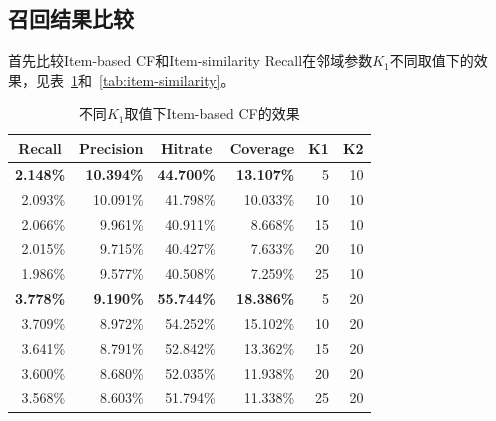     \subsection{召回结果比较}
    首先比较Item-based CF和Item-similarity Recall在邻域参数$K_1$不同取值下的效果，见表~\ref{tab:item-cf}和~\ref{tab:item-similarity}。
    \begin{table}[htbp]
      \centering
      \caption{不同$K_1$取值下Item-based CF的效果}
      \begin{tabular}{rrrrrr}
        \toprule
        \multicolumn{1}{c}{Recall} & \multicolumn{1}{c}{Precision} & \multicolumn{1}{c}{Hit\;rate} & \multicolumn{1}{c}{Coverage} & \multicolumn{1}{c}{K1} & \multicolumn{1}{c}{K2} \\
        \midrule
        \textbf{2.148\%} & \textbf{10.394\%} & \textbf{44.700\%} & \textbf{13.107\%} & 5    & 10 \\
        2.093\% & 10.091\% & 41.798\% & 10.033\% & 10   & 10 \\
        2.066\% & 9.961\% & 40.911\% & 8.668\% & 15   & 10 \\
        2.015\% & 9.715\% & 40.427\% & 7.633\% & 20   & 10 \\
        1.986\% & 9.577\% & 40.508\% & 7.259\% & 25   & 10 \\
        \textbf{3.778\%} & \textbf{9.190\%} & \textbf{55.744\%} & \textbf{18.386\%} & 5    & 20 \\
        3.709\% & 8.972\% & 54.252\% & 15.102\% & 10   & 20 \\
        3.641\% & 8.791\% & 52.842\% & 13.362\% & 15   & 20 \\
        3.600\% & 8.680\% & 52.035\% & 11.938\% & 20   & 20 \\
        3.568\% & 8.603\% & 51.794\% & 11.338\% & 25   & 20 \\
        \bottomrule
      \end{tabular}%
      \label{tab:item-cf}%
    \end{table}%

